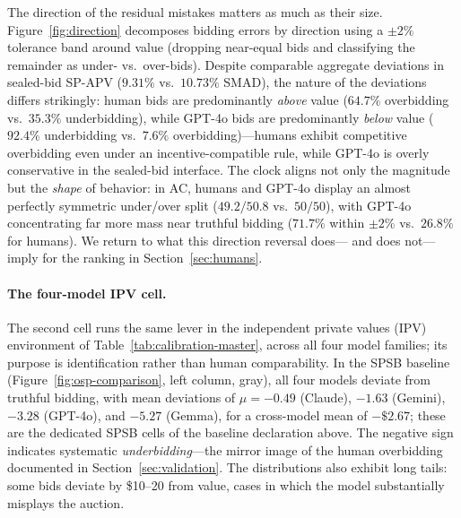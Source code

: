 The direction of the residual mistakes matters as much as their size.
Figure~\ref{fig:direction} decomposes bidding errors by direction using a
$\pm 2\%$ tolerance band around value (dropping near-equal bids and
classifying the remainder as under- vs.\ over-bids). Despite comparable
aggregate deviations in sealed-bid SP-APV ($9.31\%$ vs.\ $10.73\%$ SMAD), the
nature of the deviations differs strikingly: human bids are predominantly
\emph{above} value ($64.7\%$ overbidding vs.\ $35.3\%$ underbidding), while
GPT-4o bids are predominantly \emph{below} value ($92.4\%$ underbidding vs.\
$7.6\%$ overbidding)---humans exhibit competitive overbidding even under an
incentive-compatible rule, while GPT-4o is overly conservative in the
sealed-bid interface. The clock aligns not only the magnitude but the
\emph{shape} of behavior: in AC, humans and GPT-4o display an almost perfectly
symmetric under/over split ($49.2/50.8$ vs.\ $50/50$), with GPT-4o
concentrating far more mass near truthful bidding ($71.7\%$ within $\pm 2\%$
vs.\ $26.8\%$ for humans). We return to what this direction reversal does---%
and does not---imply for the ranking in Section~\ref{sec:humans}.

\paragraph{The four-model IPV cell.}
The second cell runs the same lever in the independent private values (IPV)
environment of Table~\ref{tab:calibration-master}, across all four model
families; its purpose is identification rather than human comparability.
In the SPSB baseline (Figure~\ref{fig:osp-comparison}, left column, gray), all
four models deviate from truthful bidding, with mean deviations of
$\mu = -0.49$ (Claude), $-1.63$ (Gemini), $-3.28$ (GPT-4o), and $-5.27$
(Gemma), for a cross-model mean of $-\$2.67$; these are the dedicated SPSB
cells of the baseline declaration above. The negative sign indicates
systematic \emph{underbidding}---the mirror image of the human overbidding
documented in Section~\ref{sec:validation}. The distributions also exhibit
long tails: some bids deviate by \$10--20 from value, cases in which the
model substantially misplays the auction.


